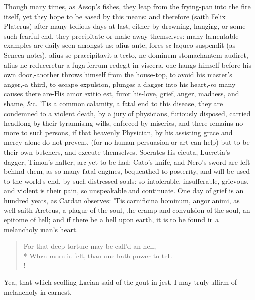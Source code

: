 Though many times, as Aesop's fishes, they leap from the frying-pan
into the fire itself, yet they hope to be eased by this means: and
therefore (saith Felix Platerus) after many tedious days at last,
either by drowning, hanging, or some such fearful end, they precipitate
or make away themselves: many lamentable examples are daily seen
amongst us: alius ante, fores se laqueo suspendit (as Seneca notes),
alius se praecipitavit a tecto, ne dominum stomachantem audiret, alius
ne reduceretur a fuga ferrum redegit in viscera, one hangs himself
before his own door,-another throws himself from the house-top, to
avoid his master's anger,-a third, to escape expulsion, plunges a
dagger into his heart,-so many causes there are-His amor exitio est,
furor his-love, grief, anger, madness, and shame, \&c. 'Tis a common
calamity, a fatal end to this disease, they are condemned to a
violent death, by a jury of physicians, furiously disposed, carried
headlong by their tyrannising wills, enforced by miseries, and there
remains no more to such persons, if that heavenly Physician, by his
assisting grace and mercy alone do not prevent, (for no human
persuasion or art can help) but to be their own butchers, and execute
themselves. Socrates his cicuta, Lucretia's dagger, Timon's halter, are
yet to be had; Cato's knife, and Nero's sword are left behind them, as
so many fatal engines, bequeathed to posterity, and will be used to the
world's end, by such distressed souls: so intolerable, insufferable,
grievous, and violent is their pain, so unspeakable and
continuate. One day of grief is an hundred years, as Cardan observes:
'Tis carnificina hominum, angor animi, as well saith Areteus, a plague
of the soul, the cramp and convulsion of the soul, an epitome of hell;
and if there be a hell upon earth, it is to be found in a melancholy
man's heart.

\begin{verse}%
For that deep torture may be call'd an hell,\\*
When more is felt, than one hath power to tell.\\!
\end{verse}%

Yea, that which scoffing Lucian said of the gout in jest, I may truly
affirm of melancholy in earnest.


